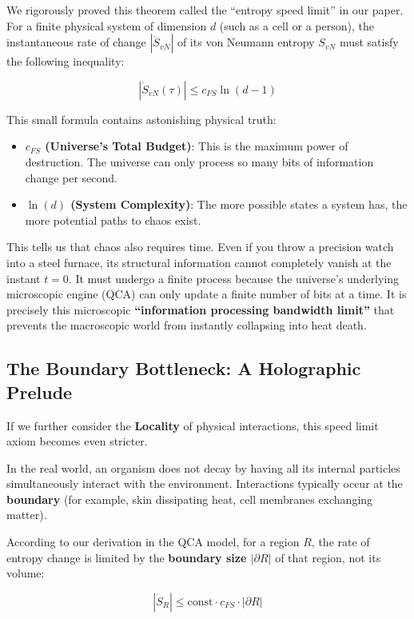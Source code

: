 We rigorously proved this theorem called the ``entropy speed limit'' in our paper. For a finite physical system of dimension $d$ (such as a cell or a person), the instantaneous rate of change $|\dot{S}_{vN}|$ of its von Neumann entropy $S_{vN}$ must satisfy the following inequality:

\[|\dot{S}_{vN}(\tau)| \le c_{FS} \ln(d-1)\]

This small formula contains astonishing physical truth:

\begin{itemize}
\item \textbf{$c_{FS}$ (Universe's Total Budget)}: This is the maximum power of destruction. The universe can only process so many bits of information change per second.

\item \textbf{$\ln(d)$ (System Complexity)}: The more possible states a system has, the more potential paths to chaos exist.
\end{itemize}

This tells us that chaos also requires time. Even if you throw a precision watch into a steel furnace, its structural information cannot completely vanish at the instant $t=0$. It must undergo a finite process because the universe's underlying microscopic engine (QCA) can only update a finite number of bits at a time. It is precisely this microscopic \textbf{``information processing bandwidth limit''} that prevents the macroscopic world from instantly collapsing into heat death.

\subsection{The Boundary Bottleneck: A Holographic Prelude}

If we further consider the \textbf{Locality} of physical interactions, this speed limit axiom becomes even stricter.

In the real world, an organism does not decay by having all its internal particles simultaneously interact with the environment. Interactions typically occur at the \textbf{boundary} (for example, skin dissipating heat, cell membranes exchanging matter).

According to our derivation in the QCA model, for a region $R$, the rate of entropy change is limited by the \textbf{boundary size $|\partial R|$} of that region, not its volume:

\[|\dot{S}_{R}| \le \text{const} \cdot c_{FS} \cdot |\partial R|\]

